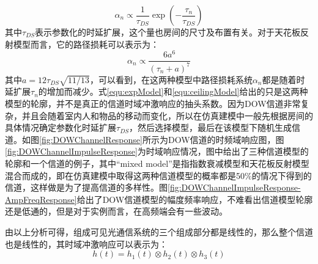 \begin{equation}
\label{equ:expModel}
\alpha_n \propto \frac{1}{\tau_{DS}}\exp\left(-\frac{\tau_n}{\tau_{DS}}\right)
\end{equation}
其中$\tau_{DS}$表示参数化的时延扩展，这个量也房间的尺寸及布置有关。对于天花板反射模型而言，它的路径损耗可以表示为：
\begin{equation}
\label{equ:ceilingModel}
\alpha_n \propto \frac{6a^6}{(\tau_n+a)^7}
\end{equation}
其中$a=12\tau_{DS}\sqrt{11/13}$，可以看到，在这两种模型中路径损耗系统$\alpha_n$都是随着时延扩展$\tau_n$的增加而减少。式\ref{equ:expModel}和\ref{equ:ceilingModel}给出的只是这两种模型的轮廓，并不是真正的信道时域冲激响应的抽头系数。因为DOW信道非常复杂，并且会随着室内人和物品的移动而变化，所以在仿真建模中一般先根据房间的具体情况确定参数化时延扩展$\tau_{DS}$，然后选择模型，最后在该模型下随机生成信道。如图\ref{fig:DOWChannelResponse}所示为DOW信道的时频域响应图，图\ref{fig:DOWChannelImpulseResponse}为时域响应情况，图中给出了三种信道模型的轮廓和一个信道的例子，其中“mixed model”是指指数衰减模型和天花板反射模型混合而成的，即在仿真建模中取得这两种信道模型的概率都是50\%的情况下得到的信道，这样做是为了提高信道的多样性。图\ref{fig:DOWChannelImpulseResponse-AmpFreqResponse}给出了DOW信道模型的幅度频率响应，不难看出信道模型轮廓还是低通的，但是对于实例而言，在高频端会有一些波动。

由以上分析可得，组成可见光通信系统的三个组成部分都是线性的，那么整个信道也是线性的，其时域冲激响应可以表示为：
\begin{equation}
h(t)=h_1(t)\otimes h_2(t)\otimes h_3(t)
\end{equation}




